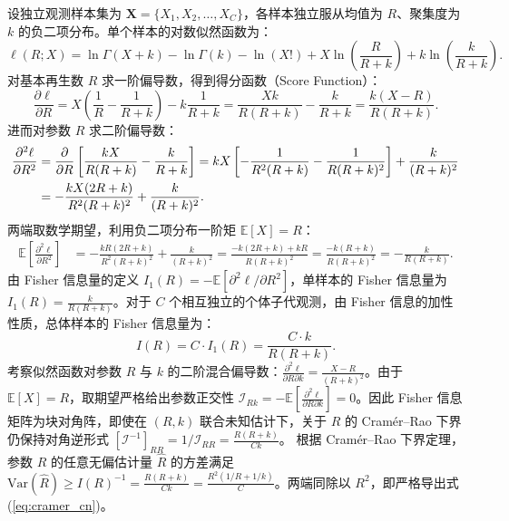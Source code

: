 \documentclass[11pt,a4paper]{article}
\theoremstyle{plain}
\theoremstyle{definition}
\begin{document}
设独立观测样本集为 $\mathbf{X} = \{X_1, X_2, \dots, X_C\}$，各样本独立服从均值为 $R$、聚集度为 $k$ 的负二项分布。单个样本的对数似然函数为：
\begin{equation}
\ell(R; X) = \ln \Gamma(X+k) - \ln \Gamma(k) - \ln(X!) + X \ln\left(\frac{R}{R+k}\right) + k \ln\left(\frac{k}{R+k}\right).
\end{equation}
对基本再生数 $R$ 求一阶偏导数，得到得分函数（Score Function）：
\begin{equation}
\frac{\partial \ell}{\partial R} = X \left( \frac{1}{R} - \frac{1}{R+k} \right) - k \frac{1}{R+k} = \frac{X k}{R(R+k)} - \frac{k}{R+k} = \frac{k(X - R)}{R(R+k)}.
\end{equation}
进而对参数 $R$ 求二阶偏导数：
\begin{align}
\frac{\partial^2 \ell}{\partial R^2} &= \frac{\partial}{\partial R} \left[ \frac{k X}{R(R+k)} - \frac{k}{R+k} \right] = k X \left[ -\frac{1}{R^2(R+k)} - \frac{1}{R(R+k)^2} \right] + \frac{k}{(R+k)^2} \notag \\
&= - \frac{k X (2R + k)}{R^2 (R+k)^2} + \frac{k}{(R+k)^2}.
\end{align}
两端取数学期望，利用负二项分布一阶矩 $\mathbb{E}[X] = R$：
\begin{align}
\mathbb{E}\left[ \frac{\partial^2 \ell}{\partial R^2} \right] &= - \frac{k R (2R + k)}{R^2 (R+k)^2} + \frac{k}{(R+k)^2} = \frac{-k(2R+k) + k R}{R(R+k)^2} = \frac{-k(R+k)}{R(R+k)^2} = - \frac{k}{R(R+k)}.
\end{align}
由 Fisher 信息量的定义 $I_1(R) = -\mathbb{E}[\partial^2 \ell / \partial R^2]$，单样本的 Fisher 信息量为 $I_1(R) = \frac{k}{R(R+k)}$。对于 $C$ 个相互独立的个体子代观测，由 Fisher 信息的加性性质，总体样本的 Fisher 信息量为：
\begin{equation}
I(R) = C \cdot I_1(R) = \frac{C \cdot k}{R(R+k)}.
\end{equation}
考察似然函数对参数 $R$ 与 $k$ 的二阶混合偏导数：$\frac{\partial^2 \ell}{\partial R \partial k} = \frac{X - R}{(R+k)^2}$。由于 $\mathbb{E}[X] = R$，取期望严格给出参数正交性 $\mathcal{I}_{Rk} = -\mathbb{E}\left[\frac{\partial^2 \ell}{\partial R \partial k}\right] = 0$。因此 Fisher 信息矩阵为块对角阵，即使在 $(R, k)$ 联合未知估计下，关于 $R$ 的 Cram\'er--Rao 下界仍保持对角逆形式 $[\mathcal{I}^{-1}]_{RR} = 1/\mathcal{I}_{RR} = \frac{R(R+k)}{Ck}$。
根据 Cram\'er--Rao 下界定理，参数 $R$ 的任意无偏估计量 $\hat{R}$ 的方差满足 $\text{Var}(\hat{R}) \ge I(R)^{-1} = \frac{R(R+k)}{C k} = \frac{R^2(1/R + 1/k)}{C}$。两端同除以 $R^2$，即严格导出式 (\ref{eq:cramer_cn})。
\end{document}
